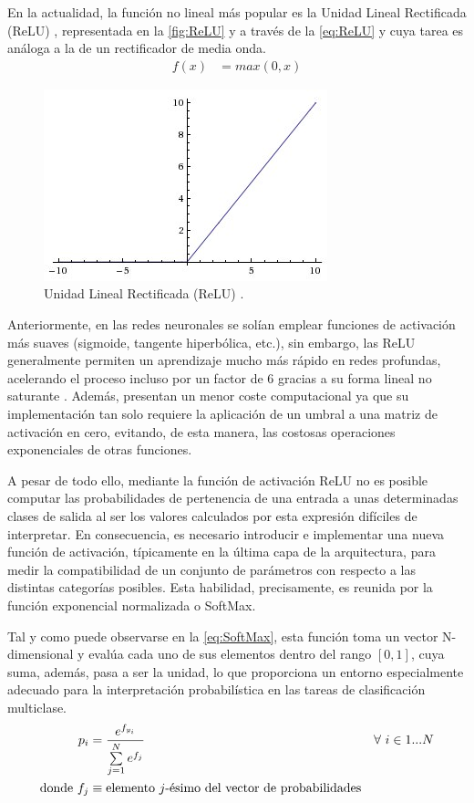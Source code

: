 En la actualidad, la función no lineal más popular es la Unidad Lineal Rectificada (ReLU) \cite{DeepLearning}, representada en la \autoref{fig:ReLU} y a través de la \autoref{eq:ReLU} y cuya tarea es análoga a la de un rectificador de media onda.
\begin{align} \label{eq:ReLU}
    f(x) &= max(0, x) 
\end{align}
\begin{figure}
    \centering
    \includegraphics[scale=0.6]{Images/ReLU.png}
    \caption{Unidad Lineal Rectificada (ReLU) \cite{img:ReLU}.}
    \label{fig:ReLU}
\end{figure}

Anteriormente, en las redes neuronales se solían emplear funciones de activación más suaves (sigmoide, tangente hiperbólica, etc.), sin embargo, las ReLU generalmente permiten un aprendizaje mucho más rápido en redes profundas, acelerando el proceso incluso por un factor de 6 gracias a su forma lineal no saturante \cite{Krizhevsky}. Además, presentan un menor coste computacional ya que su implementación tan solo requiere la aplicación de un umbral a una matriz de activación en cero, evitando, de esta manera, las costosas operaciones exponenciales de otras funciones.

A pesar de todo ello, mediante la función de activación ReLU no es posible computar las probabilidades de pertenencia de una entrada a unas determinadas clases de salida al ser los valores calculados por esta expresión difíciles de interpretar. En consecuencia, es necesario introducir e implementar una nueva función de activación, típicamente en la última capa de la arquitectura, para medir la compatibilidad de un conjunto de parámetros con respecto a las distintas categorías posibles. Esta habilidad, precisamente, es reunida por la función exponencial normalizada o SoftMax.

Tal y como puede observarse en la \autoref{eq:SoftMax}, esta función toma un vector N-dimensional y evalúa cada uno de sus elementos dentro del rango $[0, 1]$, cuya suma, además, pasa a ser la unidad, lo que proporciona un entorno especialmente adecuado para la interpretación probabilística en las tareas de clasificación multiclase.
\begin{align} \label{eq:SoftMax}
    p_i &= \frac{e^{f_{y_i}}}{\sum\limits_{j=1}^{N} e^{f_j}} & \forall \text{\space} i \in \text{$1$...$N$} \\
    \text{donde}~ 
    f_j &\equiv \text{elemento $j$-ésimo del vector de probabilidades} \notag
\end{align}

